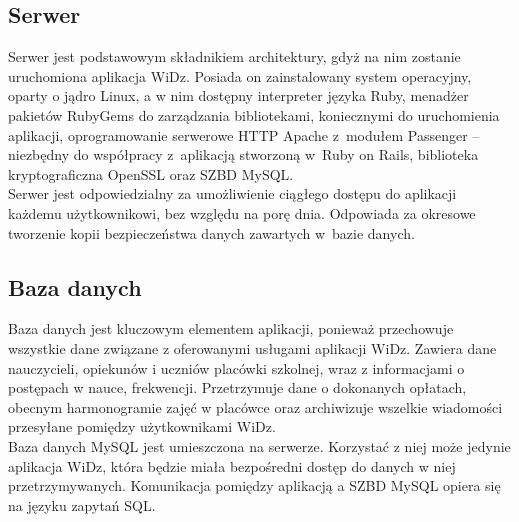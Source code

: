 \documentclass[12pt,leqno,twoside]{mwart}
\begin{document}
\subsection{Serwer}
\noindent Serwer jest podstawowym składnikiem architektury, gdyż na nim zostanie uruchomiona aplikacja WiDz. Posiada on zainstalowany system operacyjny, oparty o jądro Linux, a w nim dostępny interpreter języka Ruby, menadżer pakietów RubyGems do zarządzania bibliotekami, koniecznymi do uruchomienia aplikacji, oprogramowanie serwerowe HTTP Apache z~modułem Passenger -- niezbędny do współpracy z~aplikacją stworzoną w~Ruby on Rails, biblioteka kryptograficzna OpenSSL oraz SZBD MySQL.\\
\indent Serwer jest odpowiedzialny za umożliwienie ciągłego dostępu do aplikacji każdemu użytkownikowi, bez względu na porę dnia. Odpowiada za okresowe tworzenie kopii bezpieczeństwa danych zawartych w~bazie danych. 

\subsection{Baza danych}
\noindent Baza danych jest kluczowym elementem aplikacji, ponieważ przechowuje wszystkie dane związane z oferowanymi usługami aplikacji WiDz. Zawiera dane nauczycieli, opiekunów i uczniów placówki szkolnej, wraz z informacjami o postępach w nauce, frekwencji. Przetrzymuje dane o dokonanych opłatach, obecnym harmonogramie zajęć w placówce oraz archiwizuje wszelkie wiadomości przesyłane pomiędzy użytkownikami WiDz.\\
\indent Baza danych  MySQL jest umieszczona na serwerze. Korzystać z niej może jedynie aplikacja WiDz, która będzie miała bezpośredni dostęp do danych w niej przetrzymywanych. Komunikacja pomiędzy aplikacją a SZBD MySQL opiera się na języku zapytań SQL.
\end{document}
